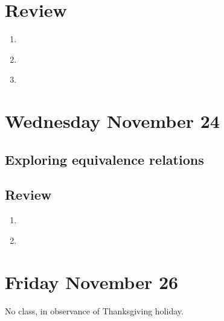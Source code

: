 \documentclass[12pt, oneside]{article}
\begin{document}
\section*{Review}
\begin{enumerate}
    \item \hspace{1in}\\  
    \item \hspace{1in}\\ 
    \item \hspace{1in}\\ 
\end{enumerate}
\newpage

\section*{Wednesday November 24}
\subsection*{Exploring equivalence relations}








\newpage

\newpage
\subsection*{Review}
\begin{enumerate}
    \item \hspace{1in}\\ 
    \item \hspace{1in}\\ 
\end{enumerate}

\newpage
\section*{Friday November 26}

No class, in observance of Thanksgiving holiday.
\end{document}
